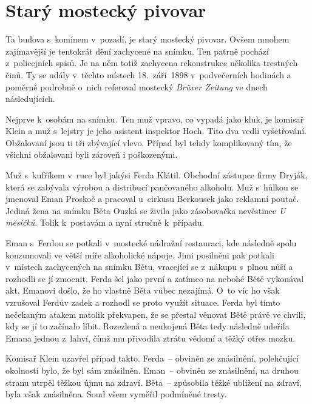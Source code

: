 
\chapter{Starý mostecký pivovar}

Ta budova s~komínem v~pozadí, je starý mostecký pivovar. Ovšem mnohem
zajímavější je tentokrát dění zachycené na snímku. Ten patrně pochází
z~policejních spisů. Je na něm totiž zachycena rekonstrukce několika
trestných činů. Ty se udály v~těchto místech 18.~září~1898
v~podvečerních hodinách a poměrně podrobně o~nich referoval mostecký
{\em Brüxer Zeitung} ve dnech následujících.

Nejprve k~osobám na snímku. Ten muž vpravo, co vypadá jako kluk, je komisař
Klein a muž s~lejstry je jeho asistent inspektor Hoch. Tito dva vedli
vyšetřování. Obžalovaní jsou ti tři zbývající vlevo. Případ byl tehdy
komplikovaný tím, že všichni obžalovaní byli zároveň i poškozenými.

Muž s~kufříkem v~ruce byl jakýsi Ferda Klátil. Obchodní zástupce firmy Dryják,
která se zabývala výrobou a distribucí pančovaného alkoholu. Muž s~hůlkou se
jmenoval Eman Proskoč a pracoval u~cirkusu Berkousek jako reklamní poutač.
Jediná žena na snímku Běta Ouzká se živila jako zásobovačka nevěstince {\em U
měsíčků}. Tolik k~postavám a nyní stručně k~případu.

Eman s~Ferdou se potkali v~mostecké nádražní restauraci, kde následně spolu
konzumovali ve větší míře alkoholické nápoje. Jimi posilněni pak potkali
v~místech zachycených na snímku Bětu, vracející se z~nákupu s~plnou nůší a
rozhodli se jí zmocnit. Ferda šel jako první a zatímco na nebohé Bětě vykonával
akt, Emanovi došlo, že ho vlastně Běta vůbec nezajímá. O~to víc ho však
vzrušoval Ferdův zadek a rozhodl se proto využít situace. Ferda byl tímto
nečekaným atakem natolik překvapen, že se přestal věnovat Bětě právě ve chvíli,
kdy se jí to začínalo líbit. Rozezlená a neukojená Běta tedy následně udeřila
Emana jednou z~lahví, čímž mu přivodila ztrátu vědomí a těžký otřes mozku.

Komisař Klein uzavřel případ takto. Ferda~-- obviněn ze znásilnění, polehčující
okolností bylo, že byl sám znásilněn. Eman~-- obviněn ze znásilnění, na druhou
stranu utrpěl těžkou újmu na zdraví. Běta~-- způsobila těžké ublížení na
zdraví, byla však znásilněna. Soud všem vyměřil podmíněné tresty.
